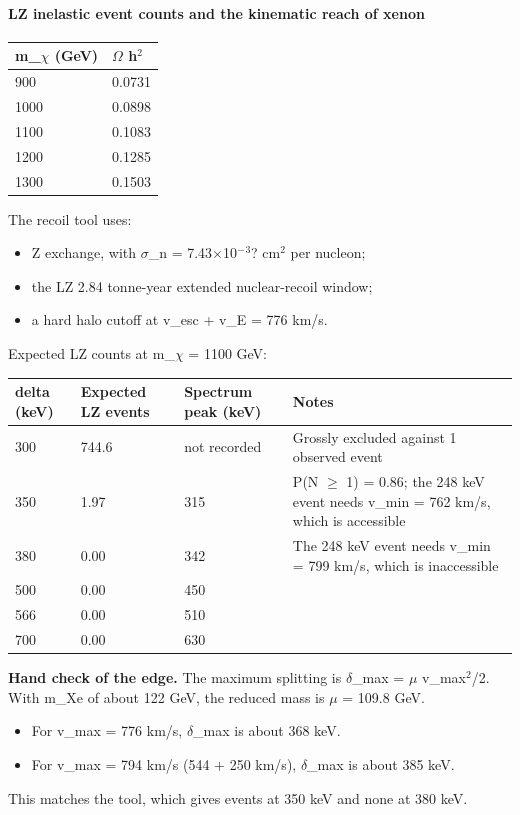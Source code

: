 \documentclass[11pt,a4paper]{article}
\begin{document}
\paragraph{LZ inelastic event counts and the kinematic reach of xenon}
\begin{longtable}{@{}p{}p{}@{}}
\toprule
\textbf{m\_$\chi$ (GeV)} & \textbf{$\Omega$ h$^2$} \\ \midrule \endhead
900 & 0.0731 \\
1000 & 0.0898 \\
1100 & 0.1083 \\
1200 & 0.1285 \\
1300 & 0.1503 \\
\bottomrule\end{longtable}
The recoil tool uses:

\begin{itemize}
  \item Z exchange, with $\sigma$\_n = 7.43$\times$10$^-$$^3$? cm$^2$ per nucleon;
  \item the LZ 2.84 tonne-year extended nuclear-recoil window;
  \item a hard halo cutoff at v\_esc + v\_E = 776 km/s.
\end{itemize}
Expected LZ counts at m\_$\chi$ = 1100 GeV:

\begin{longtable}{@{}p{}p{}p{}p{}@{}}
\toprule
\textbf{delta (keV)} & \textbf{Expected LZ events} & \textbf{Spectrum peak (keV)} & \textbf{Notes} \\ \midrule \endhead
300 & 744.6 & not recorded & Grossly excluded against 1 observed event \\
350 & 1.97 & 315 & P(N $\geq$ 1) = 0.86; the 248 keV event needs v\_min = 762 km/s, which is accessible \\
380 & 0.00 & 342 & The 248 keV event needs v\_min = 799 km/s, which is inaccessible \\
500 & 0.00 & 450 &  \\
566 & 0.00 & 510 &  \\
700 & 0.00 & 630 &  \\
\bottomrule\end{longtable}
\textbf{Hand check of the edge.} The maximum splitting is $\delta$\_max = $\mu$ v\_max$^2$/2. With m\_Xe of about 122 GeV, the reduced mass is $\mu$ = 109.8 GeV.

\begin{itemize}
  \item For v\_max = 776 km/s, $\delta$\_max is about 368 keV.
  \item For v\_max = 794 km/s (544 + 250 km/s), $\delta$\_max is about 385 keV.
\end{itemize}
This matches the tool, which gives events at 350 keV and none at 380 keV.
\end{document}
